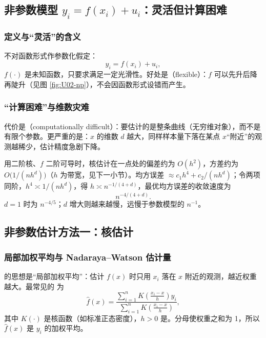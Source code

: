 \subsection{非参数模型 \texorpdfstring{$y_i=f(x_i)+u_i$}{y\_i = f(x\_i) + u\_i}：灵活但计算困难}

\subsubsection{定义与“灵活”的含义}

不对函数形式作参数化假定：
\[
y_i=f(x_i)+u_i,
\]
$f(\cdot)$ 是未知函数，只要求满足一定光滑性。好处是（flexible）：$f$ 可以先升后降再陡升（见图 \ref{fig:U02-np}），不会因函数形式设错而产生。

\subsubsection{“计算困难”与维数灾难}

代价是（computationally difficult）：要估计的是整条曲线（无穷维对象），而不是有限个参数。更严重的是：$x$ 的维数 $d$ 越大，同样样本量下落在某点 $x$“附近”的观测越稀少，估计精度急剧下降。

\begin{extend}[维数灾难的收敛速度]
用二阶核、$f$ 二阶可导时，核估计在一点处的偏差约为 $O(h^2)$，方差约为 $O\big(1/(nh^d)\big)$（$h$ 为带宽，见下一小节）。均方误差 $\approx c_1h^4+c_2/(nh^d)$；令两项同阶，$h^4\asymp 1/(nh^d)$，得 $h\asymp n^{-1/(4+d)}$，最优均方误差的收敛速度为
\[
n^{-4/(4+d)}.
\]
$d=1$ 时为 $n^{-4/5}$；$d$ 增大则越来越慢，远慢于参数模型的 $n^{-1}$。
\end{extend}

\subsection{非参数估计方法一：核估计}

\subsubsection{局部加权平均与 Nadaraya--Watson 估计量}

的思想是“局部加权平均”：估计 $f(x)$ 时只用 $x_i$ 落在 $x$ 附近的观测，越近权重越大。最常见的 为
\[
\hat f(x)=\frac{\sum_{i=1}^nK\!\left(\frac{x_i-x}{h}\right)y_i}{\sum_{i=1}^nK\!\left(\frac{x_i-x}{h}\right)},
\]
其中 $K(\cdot)$ 是核函数（如标准正态密度），$h>0$ 是。分母使权重之和为 1，所以 $\hat f(x)$ 是 $y_i$ 的加权平均。

